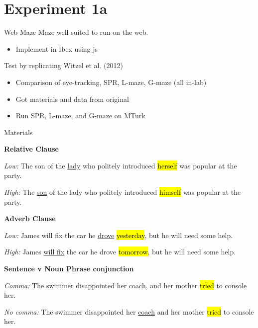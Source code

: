 \documentclass[12pt, xcolor=beamer,table,dvipsnames, ignorenonframetext, ngerman]{beamer}
\makeatletter
\let\HL\hl
\renewcommand\hl{%
	\let\set@color\beamerorig@set@color
	\let\reset@color\beamerorig@reset@color
	\HL}
\makeatother
\begin{document}
\section{Experiment 1a}
\begin{frame}{Web Maze}
Maze well suited to run on the web.
\begin{itemize}
	\item Implement in Ibex using js
\end{itemize} 

Test by replicating Witzel et al. (2012)
\begin{itemize}
	\item Comparison of eye-tracking, SPR, L-maze, G-maze (all in-lab)
	\item Got materials and data from original
	\item Run SPR, L-maze, and G-maze on MTurk
\end{itemize}
\end{frame}

\begin{frame}{Materials}

\textbf{Relative Clause}

\textit{Low:} The son of the \uline{lady} who politely introduced \hl{herself} was popular at the party.

 \textit{High:} The \uline{son} of the lady who politely introduced \hl{himself} was popular at the party.
 

\textbf{Adverb Clause}

\textit{Low:} James will fix the car he \uline{drove} \hl{yesterday}, but he will need some help.

 \textit{High:} James \uline{will fix} the car he drove \hl{tomorrow}, but he will need some help.
		
\textbf{Sentence v Noun Phrase conjunction}

 \textit{Comma:} The swimmer disappointed her \uline{coach}, and her mother \hl{tried} to console her.

\textit{No comma:} The swimmer disappointed her \uline{coach} and her mother \hl{tried} to console her.
\end{frame}
\end{document}
